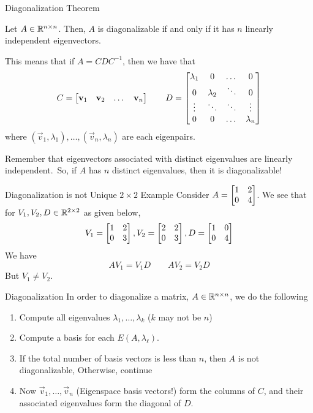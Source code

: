 \documentclass[xcoler=dvipsnames, aspectratio=169]{beamer}
\begin{document}
    \begin{frame}{Diagonalization Theorem}
        \small
        \begin{theorem}
            Let $A\in\mathbb{R}^{n\times n}$. Then, $A$ is diagonalizable if and only if it has $n$ linearly
            independent eigenvectors.
        \end{theorem}\pause
        This means that if $A=CDC^{-1}$, then we have that 
        \[
            C = \begin{bmatrix}\mathbf{v}_1 & \mathbf{v}_2 &  \dots & \mathbf{v}_n\end{bmatrix}\qquad D = \begin{bmatrix}
                \lambda_1 & 0 & \dots & 0\\
                0 & \lambda_2 & \ddots & 0\\
                \vdots & \ddots & \ddots & \vdots\\
                0 & 0 & \dots & \lambda_n
            \end{bmatrix}
        \]
        where $(\vec{v}_1,\lambda_1),\dots,(\vec{v}_n,\lambda_n)$ are each eigenpairs.\pause\\
        \begin{tcolorbox}
            Remember that eigenvectors associated with distinct eigenvalues are linearly independent.\pause\
            So, if $A$ has $n$ distinct eigenvalues, then it is diagonalizable!
        \end{tcolorbox}
    \end{frame}
    \begin{frame}{Diagonalization is not Unique $2\times 2$ Example}
        Consider $A = \begin{bmatrix}1&2\\0&4\end{bmatrix}$. We see that for $V_1,V_2,D\in\mathbb{R}^{2\times 2}$ as given below,
        \[
            V_1 = \begin{bmatrix}
                1 & 2\\
                0 & 3
            \end{bmatrix}, V_2 = \begin{bmatrix}
                2 & 2 \\
                0 & 3
            \end{bmatrix}, D = \begin{bmatrix}1 & 0\\0 & 4\end{bmatrix}
        \]\pause
        We have
        \[
            AV_1 = V_1D\qquad AV_2 = V_2D
        \]\pause
        But $V_1\neq V_2$.
    \end{frame}
    \begin{frame}{Diagonalization}
        In order to diagonalize a matrix, $A\in\mathbb{R}^{n\times n}$, we do the following
        \begin{enumerate}
            \pause\item Compute all eigenvalues $\lambda_1,\dots, \lambda_k$ \pause ($k$ may not be $n$)
            \pause\item Compute a basis for each $E(A,\lambda_\ell)$.
            \pause\item If the total number of basis vectors is less than $n$, then $A$ is not
                diagonalizable, Otherwise, continue
            \pause\item Now $\vec{v}_1,\dots,\vec{v}_n$ (Eigenspace basis vectors!) form the columns
                of $C$, and their associated eigenvalues form the diagonal of $D$.
        \end{enumerate}
    \end{frame}
\end{document}
